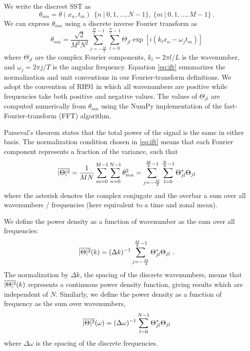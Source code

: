 \documentclass[10pt]{article}
\newcommand{\ol}{\ensuremath{\overline}}
\begin{document}
We write the discreet SST as
\begin{equation}
\theta_{mn} = \theta( x_n, t_m ) \ \ \{n\ |\ 0,1, ..., N-1\} ,\ \{m\ |\ 0,1, ..., M-1\} \ .
\end{equation}
We can express $\theta_{mn}$ using a discrete inverse Fourier transform as
\begin{equation}
\theta_{mn} = \frac{\sqrt{2}}{M^2 N^2} \sum_{j=-\frac{M}{2}}^{\frac{M}{2}-1} \sum_{l=0}^{\frac{N}{2}-1} \Theta_{jl} \exp[ i (k_l x_n - \omega_j t_m ) ] 
\label{eq:ift}
\end{equation}
where $\Theta_{jl}$ are the complex Fourier components, $k_l = 2 \pi l / L$ is the wavenumber, and $\omega_j = 2 \pi j / T$ is the   angular frequency. %
Equation \eqref{eq:ift} summarizes the normalization and unit conventions in our Fourier-transform definitions.
We adopt the convention of RH91 in which all wavenumbers are positive while frequencies take both positive and negative values. The values of $\Theta_{jl}$ are computed numerically from $\theta_{mn}$ using the NumPy implementation of the fast-Fourier-transform (FFT) algorithm. 

Parseval's theorem states that the total power of the signal is the same in either basis. The normalization condition chosen in \eqref{eq:ift} means that each Fourier component represents a fraction of the variance, such that 
\begin{equation}
\ol{|\Theta|^2} = \frac{1}{MN} \sum_{m=0}^{M-1} \sum_{n=0}^{N-1} \theta_{mn}^2 = \sum_{j=-\frac{M}{2}}^{\frac{M}{2}-1} \sum_{l=0}^{\frac{N}{2}-1} \Theta_{jl}^\ast  \Theta_{jl} 
\end{equation}
where the asterisk denotes the complex conjugate and the overbar a sum over all wavenumbers / frequencies (here equivalent to a time and zonal mean).

We define the power density as a function of wavenumber as the sum over all frequencies:
\begin{equation}
\ol{|\Theta|^2}(k) = (\Delta k)^{-1} \sum_{j=-\frac{M}{2}}^{\frac{M}{2}-1} \Theta_{jl}^\ast  \Theta_{jl} \ .
\label{eq:Theta_kappa}
\end{equation}
The normalization by $\Delta k$, the spacing of the discrete wavenumbers, means that $\ol{|\Theta|^2}(k)$ represents a continuous power density function, giving results which are independent of $N$.  
Similarly, we define the power density as a function of frequency as the sum over wavenumbers,
\begin{equation}
\ol{|\Theta|^2}(\omega) = (\Delta \omega)^{-1} \sum_{l=0}^{N-1} \Theta_{jl}^\ast   \Theta_{jl} 
\end{equation}
where $\Delta \omega$ is the spacing of the discrete frequencies.
\end{document}
